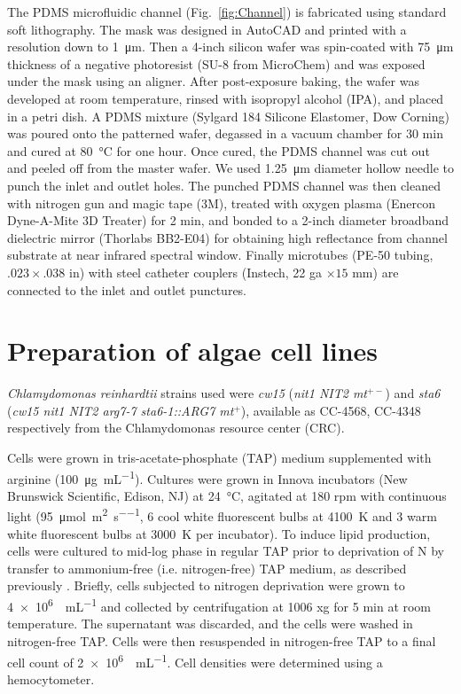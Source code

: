 \documentclass[aps,pra,reprint,longbibliography,groupedaddress]{revtex4-1}
\begin{document}
The PDMS microfluidic channel (Fig.~\ref{fig:Channel}) is fabricated using standard soft lithography. The mask was designed in AutoCAD and printed with a resolution down to \SI{1}{\micro\meter}. Then a 4-inch silicon wafer was spin-coated with \SI{75}{\micro\meter} thickness of a negative photoresist (SU-8 from MicroChem) and was exposed under the mask using an aligner. After post-exposure baking, the wafer was developed at room temperature, rinsed with isopropyl alcohol (IPA), and placed in a petri dish. A PDMS mixture (Sylgard 184 Silicone Elastomer, Dow Corning) was poured onto the patterned wafer, degassed in a vacuum chamber for 30 min and cured at \SI{80}{\degreeCelsius} for one hour. Once cured, the PDMS channel was cut out and peeled off from the master wafer. We used \SI{1.25}{\micro\meter} diameter hollow needle to punch the inlet and outlet holes. 
The punched PDMS channel was then cleaned with nitrogen gun and magic tape (3M), treated with oxygen plasma (Enercon Dyne-A-Mite 3D Treater) for 2 min, and bonded to a 2-inch diameter broadband dielectric mirror (Thorlabs BB2-E04) for obtaining high reflectance from channel substrate at near infrared spectral window. Finally microtubes (PE-50 tubing, $.023 \times .038$ in) with steel catheter couplers (Instech, 22 ga $\times 15$ mm) are connected to the inlet and outlet punctures.


\section{Preparation of algae cell lines}

\textit{Chlamydomonas reinhardtii} strains used were \textit{cw15} (\textit{nit1 NIT2 mt$^{+-}$}) and \textit{sta6} (\textit{cw15 nit1 NIT2 arg7-7 sta6-1::ARG7 mt$^+$}), available as CC-4568, CC-4348 respectively from the Chlamydomonas resource center (CRC)\cite{minnesota2015chlamydomonas}.

Cells were grown in tris-acetate-phosphate (TAP) medium supplemented with arginine (\SI{100}{\micro\gram\per\milli\liter}). Cultures were grown in Innova incubators (New Brunswick Scientific, Edison, NJ) at \SI{24}{\degreeCelsius}, agitated at 180 rpm with continuous light (\SI{95}{\micro\mole\per\square\meter\per\second}, 6 cool white fluorescent bulbs at \SI{4100}{\kelvin} and 3 warm white fluorescent bulbs at \SI{3000}{\kelvin} per incubator). To induce lipid production, cells were cultured to mid-log phase in regular TAP prior to deprivation of N by transfer to ammonium-free (i.e. nitrogen-free) TAP medium, as described previously \cite{blaby2013systems}. Briefly, cells subjected to nitrogen deprivation were grown to \SI{4e6}{\cells\per\milli\liter} and collected by centrifugation at 1006 xg for 5 min at room temperature. The supernatant was discarded, and the cells were washed in nitrogen-free TAP. Cells were then resuspended in nitrogen-free TAP to a final cell count of \SI{2e6}{\cells\per\milli\liter}. Cell densities were determined using a hemocytometer.
\end{document}
